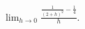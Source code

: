 \label{problemlimhto0(1/(2+h)^2-1/4)/h}
$ \displaystyle \lim_{h\to 0} \frac{\frac{1}{(2+h)^2}-\frac{1}{4}}{h}  $.

